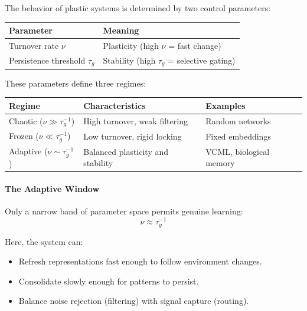\documentclass[11pt]{article}
\begin{document}
The behavior of plastic systems is determined by two control parameters:

\begin{table}[h]
\centering
\begin{tabular}{ll}
\hline
\textbf{Parameter}             & \textbf{Meaning}                \\
\hline
Turnover rate $\nu$            & Plasticity (high $\nu$ = fast change) \\
Persistence threshold $\tau_g$ & Stability (high $\tau_g$ = selective gating) \\
\hline
\end{tabular}
\end{table}

These parameters define three regimes:

\begin{table}[h]
\centering
\begin{tabular}{lll}
\hline
\textbf{Regime}  & \textbf{Characteristics}              & \textbf{Examples}        \\
\hline
Chaotic ($\nu \gg \tau_g^{-1}$)     & High turnover, weak filtering         & Random networks          \\
Frozen ($\nu \ll \tau_g^{-1}$)       & Low turnover, rigid locking          & Fixed embeddings         \\
Adaptive ($\nu \sim \tau_g^{-1}$)    & Balanced plasticity and stability    & VCML, biological memory  \\
\hline
\end{tabular}
\end{table}

\paragraph{The Adaptive Window}

Only a narrow band of parameter space permits genuine learning:
\begin{equation}
\nu \approx \tau_g^{-1}
\end{equation}

Here, the system can:
\begin{itemize}
\item Refresh representations fast enough to follow environment changes.
\item Consolidate slowly enough for patterns to persist.
\item Balance noise rejection (filtering) with signal capture (routing).
\end{itemize}
\end{document}
